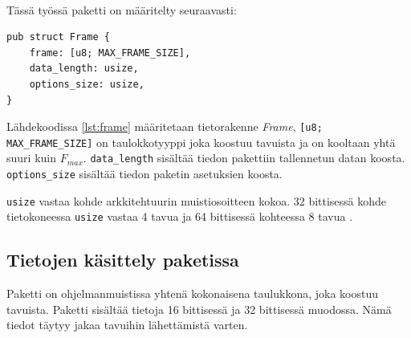 \documentclass[a4paper,12pt]{article}
\begin{document}
\begin{table}[h!]\
    \centering
    \caption{Paketin rakenne}
    \label{tab:my_label}
\end{table}

Tässä työssä paketti on määritelty seuraavasti:
\begin{lstlisting}[caption={Paketin rakenne}, label={lst:frame}]
pub struct Frame {
    frame: [u8; MAX_FRAME_SIZE],
    data_length: usize,
    options_size: usize,
}
\end{lstlisting}
Lähdekoodissa \ref{lst:frame} määritetaan tietorakenne \textit{Frame},
\lstinline{[u8; MAX_FRAME_SIZE]} on taulokkotyyppi joka koostuu tavuista ja on kooltaan yhtä suuri kuin $F_{max}$.
\lstinline{data_length} sisältää tiedon pakettiin tallennetun datan koosta. \lstinline{options_size} sisältää tiedon paketin asetuksien koosta.\par
\lstinline{usize} vastaa kohde arkkitehtuurin muistiosoitteen kokoa. 32 bittisessä kohde tietokoneessa \lstinline{usize} vastaa 4 tavua ja 64 bittisessä kohteessa 8 tavua \cite{rust-doc-usize}.

\subsection{Tietojen käsittely paketissa}
    Paketti on ohjelmanmuistissa yhtenä kokonaisena taulukkona, joka koostuu tavuista.
    Paketti sisältää tietoja 16 bittisessä ja 32 bittisessä muodossa. Nämä tiedot täytyy jakaa tavuihin lähettämistä varten.
\end{document}
